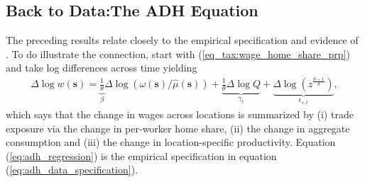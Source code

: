\documentclass[pdftex,12pt]{article}
\begin{document}
\subsection{Back to Data:The ADH Equation}

\medskip
\noindent The preceding results relate closely to the empirical specification and evidence of \citet{david2013china}. To do illustrate the connection, start with (\ref{eq_tax:wage_home_share_prp}) and take log differences across time yielding
\begin{align}
 \Delta \log w(\textbf{s}) =  \underbrace{\frac{1}{\theta}}_{\beta}\Delta \log \left( \omega(\textbf{s})/\hat \mu( \textbf{s})\right) +  \underbrace{\frac{1}{\theta}\Delta \log Q}_{\gamma_t} + \underbrace{\Delta \log \left(z^{\frac{\theta-1}{\theta}}\right)}_{\epsilon_{s,t}},
\label{eq:adh_regression}
\end{align}
which says that the change in wages across locations is summarized by (i) trade exposure via the change in per-worker home share, (ii) the change in aggregate consumption and (iii) the change in location-specific productivity. Equation (\ref{eq:adh_regression}) is the empirical specification in equation (\ref{eq:adh_data_specification}).
\end{document}
